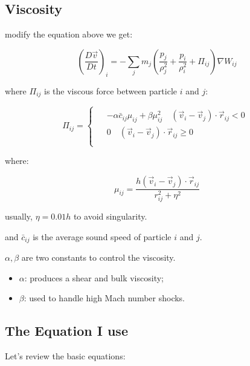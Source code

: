 \documentclass[10pt, oneside]{article}
\begin{document}
\subsection{Viscosity}

modify the equation above we get:

\begin{equation}
    \left(\frac{D \vec{v}}{Dt}\right)_i = -\sum_j
    m_j\left(
        \frac{p_j}{\rho_j^2}+\frac{p_i}{\rho_i^2}
        +\Pi_{ij}
    \right)\nabla W_{ij}
\end{equation}

where $\Pi_{ij}$ is the viscous force between particle $i$ and $j$:

\begin{equation}
    \Pi_{ij}=
    \begin{cases}
        \begin{aligned}
            &-\alpha \bar{c}_{ij}\mu_{ij}+\beta\mu_{ij}^2\quad (\vec{v}_i-\vec{v}_j)\cdot \vec{r}_{ij}<0\\
            &0 \quad (\vec{v}_i-\vec{v}_j)\cdot \vec{r}_{ij}\geq 0\\
        \end{aligned}
    \end{cases}
\end{equation}

where:

\begin{equation}
    \mu_{ij}=\frac{h (\vec{v}_i-\vec{v}_j)\cdot \vec{r}_{ij}}{r_{ij}^2 + \eta^2}
\end{equation}

usually, $\eta =  0.01h$ to avoid singularity.

and $\bar{c}_{ij}$ is the average sound speed of particle $i$ and $j$.

$\alpha,\beta$ are two constants to control the viscosity.

\begin{itemize}
    \item $\alpha$: produces a shear and bulk viscosity;
    \item $\beta$: used to handle high Mach number shocks.
\end{itemize}


\subsection{The Equation I use}

Let's review the basic equations:
\end{document}
